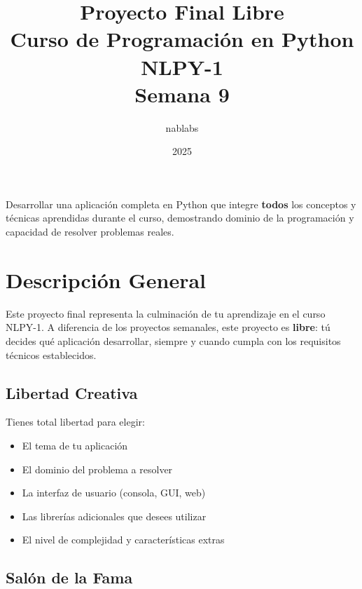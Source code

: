 \documentclass[12pt,a4paper]{article}
\title{\textbf{\Huge Proyecto Final Libre}\\[0.5em]
\Large Curso de Programación en Python NLPY-1\\[0.5em]
\large Semana 9}
\author{nablabs}
\date{2025}
\begin{document}
\maketitle
\thispagestyle{empty}

\vspace{1cm}

\begin{tcolorbox}[colback=nablue!5!white,colframe=nablue,title=\textbf{Objetivo del Proyecto}]
Desarrollar una aplicación completa en Python que integre \textbf{todos} los conceptos y técnicas aprendidas durante el curso, demostrando dominio de la programación y capacidad de resolver problemas reales.
\end{tcolorbox}

\newpage

\tableofcontents

\newpage

\section{Descripción General}

Este proyecto final representa la culminación de tu aprendizaje en el curso NLPY-1. A diferencia de los proyectos semanales, este proyecto es \textbf{libre}: tú decides qué aplicación desarrollar, siempre y cuando cumpla con los requisitos técnicos establecidos.

\subsection{Libertad Creativa}

Tienes total libertad para elegir:
\begin{itemize}
    \item El tema de tu aplicación
    \item El dominio del problema a resolver
    \item La interfaz de usuario (consola, GUI, web)
    \item Las librerías adicionales que desees utilizar
    \item El nivel de complejidad y características extras
\end{itemize}

\subsection{Salón de la Fama}
\end{document}
